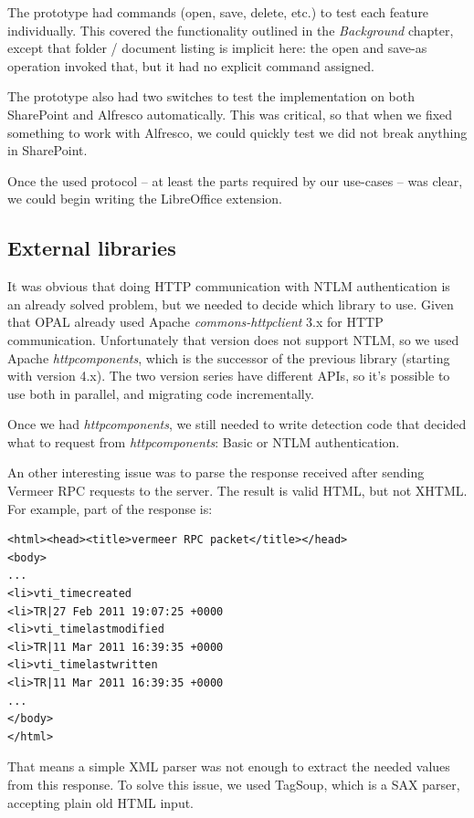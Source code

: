 The prototype had commands (open, save, delete, etc.) to test each feature
individually.  This covered the functionality outlined in the \emph{Background}
chapter, except that folder / document listing is implicit here: the open and
save-as operation invoked that, but it had no explicit command assigned.

The prototype also had two switches to test the implementation on both
SharePoint and Alfresco automatically. This was critical, so that when we fixed
something to work with Alfresco, we could quickly test we did not break
anything in SharePoint.

Once the used protocol -- at least the parts required by our use-cases -- was
clear, we could begin writing the LibreOffice extension.

\subsection{External libraries}

It was obvious that doing HTTP communication with NTLM authentication is an
already solved problem, but we needed to decide which library to use. Given that
OPAL already used Apache \emph{commons-httpclient}\cite{httpclient} 3.x for
HTTP communication. Unfortunately that version does not support NTLM, so we used
Apache \emph{httpcomponents}\cite{httpcomponents}, which is the successor of
the previous library (starting with version 4.x). The two version series have
different APIs, so it's possible to use both in parallel, and migrating code
incrementally.

Once we had \emph{httpcomponents}, we still needed to write detection code that
decided what to request from \emph{httpcomponents}: Basic or NTLM
authentication.

An other interesting issue was to parse the response received after sending
Vermeer RPC requests to the server. The result is valid HTML, but not XHTML.
For example, part of the response is:

\begin{lstlisting}
<html><head><title>vermeer RPC packet</title></head>
<body>
...
<li>vti_timecreated
<li>TR|27 Feb 2011 19:07:25 +0000
<li>vti_timelastmodified
<li>TR|11 Mar 2011 16:39:35 +0000
<li>vti_timelastwritten
<li>TR|11 Mar 2011 16:39:35 +0000
...
</body>
</html>\end{lstlisting}

That means a simple XML parser was not enough to extract the needed values from
this response. To solve this issue, we used TagSoup\cite{tagsoup}, which is a
SAX parser, accepting plain old HTML input.

